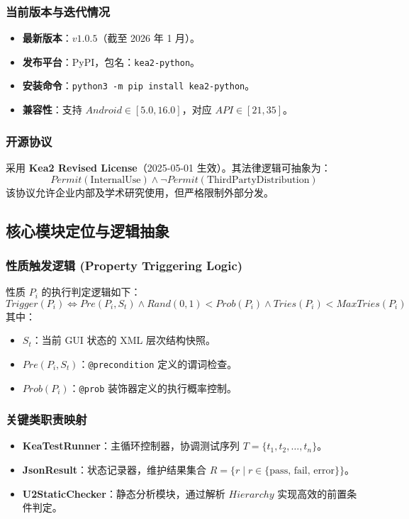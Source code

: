 \documentclass[a4paper, zihao=-4]{ctexart}
\begin{document}
\subsubsection{当前版本与迭代情况}
\begin{itemize}
    \item \textbf{最新版本}：$v1.0.5$（截至 2026 年 1 月）。
    \item \textbf{发布平台}：PyPI，包名：\texttt{kea2-python}。
    \item \textbf{安装命令}：\texttt{python3 -m pip install kea2-python}。
    \item \textbf{兼容性}：支持 $Android \in [5.0, 16.0]$，对应 $API \in [21, 35]$。
\end{itemize}

\subsubsection{开源协议}
采用 \textbf{Kea2 Revised License}（2025-05-01 生效）。其法律逻辑可抽象为：
\begin{equation}
    Permit(\text{InternalUse}) \land \neg Permit(\text{ThirdPartyDistribution})
\end{equation}
该协议允许企业内部及学术研究使用，但严格限制外部分发。

\subsection{核心模块定位与逻辑抽象}

\subsubsection{性质触发逻辑 (Property Triggering Logic)}
性质 $P_i$ 的执行判定逻辑如下：
\begin{equation}
    Trigger(P_i) \iff Pre(P_i, S_t) \land Rand(0, 1) < Prob(P_i) \land Tries(P_i) < MaxTries(P_i)
\end{equation}
其中：
\begin{itemize}
    \item $S_t$：当前 GUI 状态的 XML 层次结构快照。
    \item $Pre(P_i, S_t)$：\texttt{@precondition} 定义的谓词检查。
    \item $Prob(P_i)$：\texttt{@prob} 装饰器定义的执行概率控制。
\end{itemize}

\subsubsection{关键类职责映射}
\begin{itemize}
    \item \textbf{KeaTestRunner}：主循环控制器，协调测试序列 $T = \{t_1, t_2, \dots, t_n\}$。
    \item \textbf{JsonResult}：状态记录器，维护结果集合 $R = \{r \mid r \in \{\text{pass, fail, error}\}\}$。
    \item \textbf{U2StaticChecker}：静态分析模块，通过解析 $Hierarchy$ 实现高效的前置条件判定。
\end{itemize}
\end{document}
